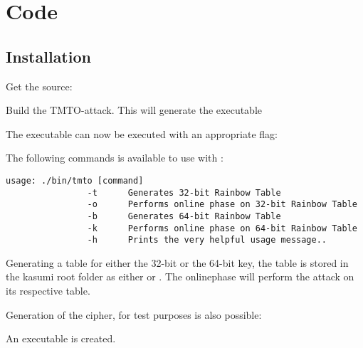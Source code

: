 \chapter{Code}
\section{Installation}
\label{sec:inst}
Get the source:

\quad{}

Build the TMTO-attack. This will generate the executable

\quad{}

The executable  can now be executed with an appropriate
flag:

\quad{}

The following commands is available to use with :
\begin{verbatim}
usage: ./bin/tmto [command] 
                -t      Generates 32-bit Rainbow Table 
                -o      Performs online phase on 32-bit Rainbow Table 
                -b      Generates 64-bit Rainbow Table 
                -k      Performs online phase on 64-bit Rainbow Table 
                -h      Prints the very helpful usage message.. 
\end{verbatim}

Generating a table for either the 32-bit or the 64-bit key, the table
is stored in the kasumi root folder as either  or
. The onlinephase will perform the attack on its
respective table.

Generation of the cipher, for test purposes is also possible:

\quad{}

An executable  is created. 


